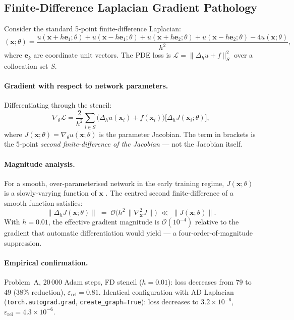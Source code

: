 \documentclass{article}
\newcommand{\relL}{\varepsilon_{\mathrm{rel}}}
\newcommand{\bfx}{\mathbf{x}}
\begin{document}
\subsection{Finite-Difference Laplacian Gradient Pathology}
\label{app:fd_pathology}

Consider the standard 5-point finite-difference Laplacian:
\begin{equation}
  [\Delta_h u](\bfx;\theta)
  = \frac{u(\bfx{+}h\mathbf{e}_1;\theta)
        + u(\bfx{-}h\mathbf{e}_1;\theta)
        + u(\bfx{+}h\mathbf{e}_2;\theta)
        + u(\bfx{-}h\mathbf{e}_2;\theta)
        - 4u(\bfx;\theta)}{h^2},
\label{eq:fd_lap}
\end{equation}
where $\mathbf{e}_k$ are coordinate unit vectors.
The PDE loss is $\mathcal{L} = \|\Delta_h u + f\|^2_{S}$ over a collocation
set $S$.

\paragraph{Gradient with respect to network parameters.}
Differentiating through the stencil:
\begin{equation}
  \nabla_\theta\mathcal{L}
  = \frac{2}{h^2}\sum_{i\in S}
    \bigl(\Delta_h u(\bfx_i) + f(\bfx_i)\bigr)
    \bigl[\Delta_h J(\bfx_i;\theta)\bigr],
\label{eq:fd_grad}
\end{equation}
where $J(\bfx;\theta) = \nabla_\theta u(\bfx;\theta)$ is the
parameter Jacobian.
The term in brackets is the 5-point \emph{second finite-difference of the
Jacobian} — not the Jacobian itself.

\paragraph{Magnitude analysis.}
For a smooth, over-parameterised network in the early training regime,
$J(\bfx;\theta)$ is a slowly-varying function of $\bfx$
\citep{wang2021ntk}.
The centred second finite-difference of a smooth function satisfies:
\begin{equation}
  \|\Delta_h J(\bfx;\theta)\|
  \;=\; \mathcal{O}\!\bigl(h^2\,\|\nabla^2_\bfx J\|\bigr)
  \;\ll\; \|J(\bfx;\theta)\|.
\label{eq:fd_mag}
\end{equation}
With $h = 0.01$, the effective gradient magnitude is $\mathcal{O}(10^{-4})$
relative to the gradient that automatic differentiation would yield —
a four-order-of-magnitude suppression.

\paragraph{Empirical confirmation.}
Problem~A, 20\,000 Adam steps, FD stencil ($h=0.01$):
loss decreases from $79$ to $49$ (38\% reduction), $\relL = 0.81$.
Identical configuration with AD Laplacian (\texttt{torch.autograd.grad},
\texttt{create\_graph=True}):
loss decreases to $3.2\times10^{-6}$, $\relL = 4.3\times10^{-6}$.
\end{document}
